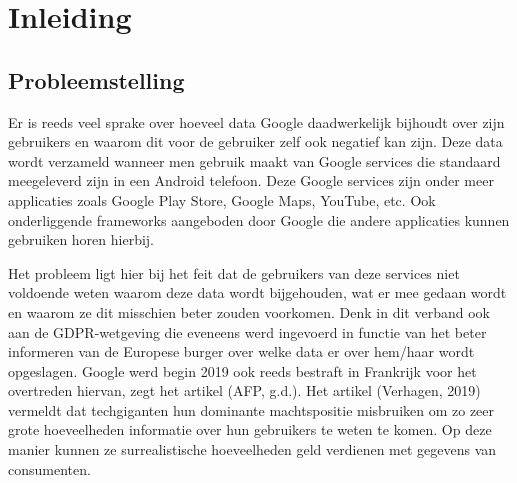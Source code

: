 
\chapter{Inleiding}
\label{ch:inleiding}




\section{Probleemstelling}
\label{sec:probleemstelling}

Er is reeds veel sprake over hoeveel data Google daadwerkelijk bijhoudt over zijn gebruikers en waarom dit voor de gebruiker zelf ook negatief kan zijn. Deze data wordt verzameld wanneer men gebruik maakt van Google services die standaard meegeleverd zijn in een Android telefoon. Deze Google services zijn onder meer applicaties zoals Google Play Store, Google Maps, YouTube, etc. Ook onderliggende frameworks aangeboden door Google die andere applicaties kunnen gebruiken horen hierbij. 

Het probleem ligt hier bij het feit dat de gebruikers van deze services niet voldoende weten waarom deze data wordt bijgehouden, wat er mee gedaan wordt en waarom ze dit misschien beter zouden voorkomen. Denk in dit verband ook aan de GDPR-wetgeving die eveneens werd ingevoerd in functie van het beter informeren van de Europese burger over welke data er over hem/haar wordt opgeslagen. Google werd begin 2019 ook reeds bestraft in Frankrijk voor het overtreden hiervan, zegt het artikel (AFP, g.d.). Het artikel (Verhagen, 2019) vermeldt dat techgiganten hun dominante machtspositie misbruiken om zo zeer grote hoeveelheden informatie over hun gebruikers te weten te komen. Op deze manier kunnen ze surrealistische hoeveelheden geld verdienen met gegevens van consumenten. 

